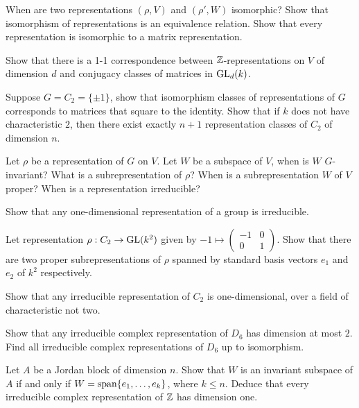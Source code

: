 \begin{question}{3}
    When are two representations $(\rho,V)$ and $(\rho',W)$ isomorphic? Show that isomorphism of representations is an equivalence relation. Show that every representation is isomorphic to a matrix representation.

    Show that there is a 1-1 correspondence between $\mathbb{Z}$-representations on $V$ of dimension $d$ and conjugacy classes of matrices in $\text{GL}_d(k)$.

    Suppose $G = C_2 = \{\pm 1\}$, show that isomorphism classes of representations of $G$ corresponds to matrices that square to the identity. Show that if $k$ does not have characteristic $2$, then there exist exactly $n+1$ representation classes of $C_2$ of dimension $n$.
\end{question}

\begin{question}{4}
    Let $\rho$ be a representation of $G$ on $V$. Let $W$ be a subspace of $V$, when is $W$ $G$-invariant? What is a subrepresentation of $\rho$? When is a subrepresentation $W$ of $V$ proper? When is a representation irreducible?

    Show that any one-dimensional representation of a group is irreducible.

    Let representation $\rho : C_2 \rightarrow \text{GL}(k^2)$ given by $-1 \mapsto \begin{pmatrix}
        -1 & 0\\0 & 1
    \end{pmatrix}$. Show that there are two proper subrepresentations of $\rho$ spanned by standard basis vectors $e_1$ and $e_2$ of $k^2$ respectively.

    Show that any irreducible representation of $C_2$ is one-dimensional, over a field of characteristic not two.

    Show that any irreducible complex  representation of $D_6$ has dimension at most $2$. Find all irreducible complex representations of $D_6$ up to isomorphism.
\end{question}

\begin{question}{5}
	Let $A$ be a Jordan block of dimension $n$. Show that $W$ is an invariant subspace of $A$ if and only if $W = \text{span}\{e_1,\dots,e_k\}$, where $k \leq n$. Deduce that every irreducible complex representation of $\mathbb{Z}$ has dimension one.
\end{question}

